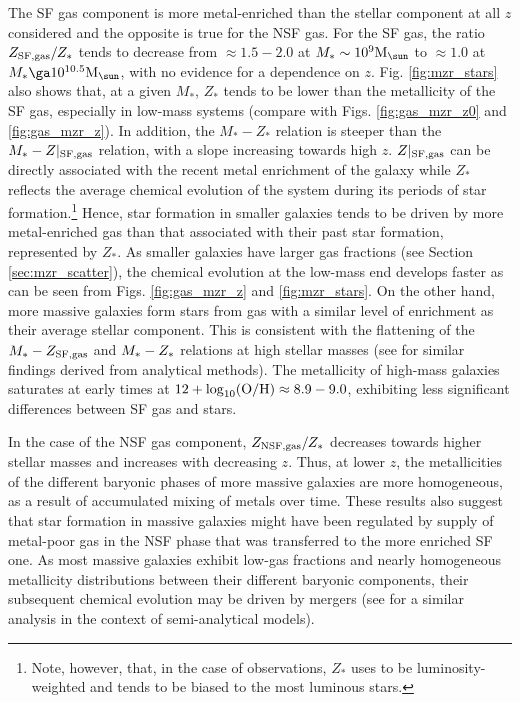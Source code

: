 \documentclass[useAMS,usenatbib]{mn2e}
\begin{document}
The SF gas component is more metal-enriched than the stellar component at all $z$ considered and the opposite
is true for the NSF gas.
For the SF gas, the ratio $Z_{\rm SF,gas} / Z_*$ tends to decrease from $\approx 1.5-2.0$ at $M_* \sim 10^9 {\rm M}_{\sun}$
to $\approx 1.0$ at $M_* \ga 10^{10.5} {\rm M}_{\sun}$, with no evidence for a dependence on $z$.
Fig. \ref{fig:mzr_stars} also shows that, at a given $M_*$, $Z_*$ tends to be lower than the metallicity of the SF gas, 
especially in low-mass systems (compare with Figs. \ref{fig:gas_mzr_z0} and  \ref{fig:gas_mzr_z}).
In addition, the $M_* - Z_*$ relation is steeper than the $M_* - Z|_{\rm SF,gas}$ relation, 
with a slope increasing towards high $z$. 
$Z|_{\rm SF,gas}$ can be directly associated with the
recent metal enrichment of the galaxy while $Z_*$ reflects the average chemical evolution
of the system during its periods of star formation.\footnote{Note, however, that, in the case of observations, 
$Z_*$ uses to be luminosity-weighted and tends to be biased to the most luminous stars.}  
Hence, star formation in smaller galaxies tends to be driven by more metal-enriched gas than
that associated with their past star formation, represented by $Z_*$.  
As smaller galaxies have larger gas fractions (see Section \ref{sec:mzr_scatter}), the chemical evolution at the low-mass end develops faster as can be 
seen from Figs. \ref{fig:gas_mzr_z} and \ref{fig:mzr_stars}.
On the other hand, more massive galaxies form stars from gas with a similar level
of enrichment as their average stellar component.  This is 
consistent with the flattening of the $M_* - Z_{\rm SF,gas}$ and $M_* - Z_{\rm *}$ relations at high stellar masses
(see \citealt{zahid2014a} for similar findings derived from analytical methods).
The metallicity of high-mass
galaxies saturates at early times at $12+ \log_{10} ({\rm O/H}) \approx 8.9-9.0$, exhibiting less significant differences between SF gas and stars.

In the case of the NSF gas component, $Z_{\rm NSF,gas} / Z_*$ decreases towards higher stellar masses and increases with
decreasing $z$.  Thus, at lower $z$,  the metallicities of the different
baryonic phases of more massive galaxies are more homogeneous, as a result of accumulated mixing of metals over time. 
These results also suggest that star formation in massive galaxies might have been regulated by 
supply of metal-poor gas in the NSF phase that was transferred to the more enriched SF one.  
As most massive galaxies exhibit low-gas fractions and nearly homogeneous metallicity distributions between
their different baryonic components, their subsequent chemical evolution may be driven by mergers
(see \citealt{yates2014} for a similar analysis in the context of semi-analytical models).
\end{document}
